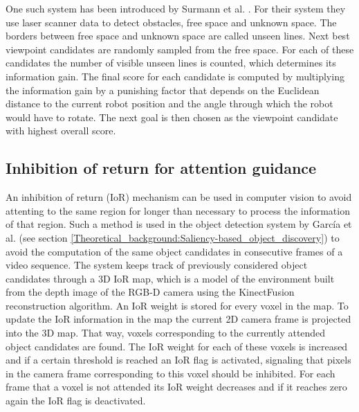 \documentclass[a4paper,11pt,english]{article}
\begin{document}
One such system has been introduced by Surmann et al. \cite{surmann2003autonomous}.
For their system they use laser scanner data to detect obstacles, free space and unknown space.
The borders between free space and unknown space are called unseen lines.
Next best viewpoint candidates are randomly sampled from the free space.
For each of these candidates the number of visible unseen lines is counted, which determines its information gain.
The final score for each candidate is computed by multiplying the information gain by a punishing factor that depends on the Euclidean distance to the current robot position and the angle through which the robot would have to rotate.
The next goal is then chosen as the viewpoint candidate with highest overall score.


\subsection{Inhibition of return for attention guidance}
\label{Theoretical_background:IoR mechanism_to_guide_attention}
An inhibition of return (IoR) mechanism can be used in computer vision to avoid attenting to the same region for longer than necessary to process the information of that region.
Such a method is used in the object detection system by García et al.\cite{garcia2015saliency} (see section \ref{Theoretical_background:Saliency-based_object_discovery}) to avoid the computation of the same object candidates in consecutive frames of a video sequence.
The system keeps track of previously considered object candidates through a 3D IoR map, which is a model of the environment built from the depth image of the RGB-D camera using the KinectFusion reconstruction algorithm\cite{newcombe2011kinectfusion}.
An IoR weight is stored for every voxel in the map.
To update the IoR information in the map the current 2D camera frame is projected into the 3D map.
That way, voxels corresponding to the currently attended object candidates are found.
The IoR weight for each of these voxels is increased and if a certain threshold is reached an IoR flag is activated, signaling that pixels in the camera frame corresponding to this voxel should be inhibited.
For each frame that a voxel is not attended its IoR weight decreases and if it reaches zero again the IoR flag is deactivated.
\end{document}
